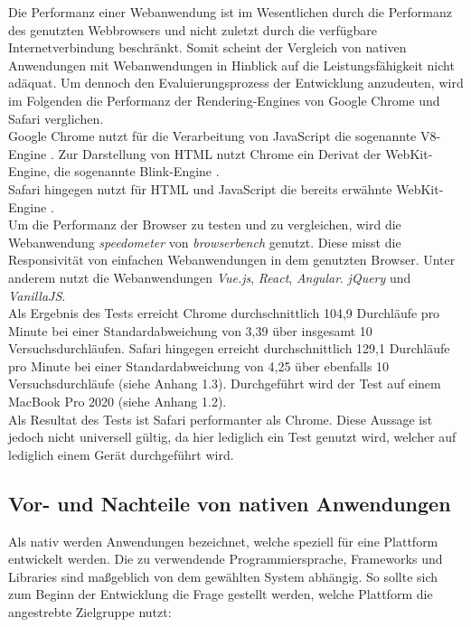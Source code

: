 \documentclass[a4paper]{scrartcl}
\begin{document}
Die Performanz einer Webanwendung ist im Wesentlichen durch die Performanz des genutzten Webbrowsers und nicht zuletzt durch die verfügbare Internetverbindung beschränkt. Somit scheint der Vergleich von nativen Anwendungen mit Webanwendungen in Hinblick auf die Leistungsfähigkeit nicht adäquat. Um dennoch den Evaluierungsprozess der Entwicklung anzudeuten, wird im Folgenden die Performanz der Rendering-Engines von Google Chrome und Safari verglichen. \\ 
Google Chrome nutzt für die Verarbeitung von JavaScript die sogenannte V8-Engine \autocite{v8_Engine}. Zur Darstellung von HTML nutzt Chrome ein Derivat der WebKit-Engine, die sogenannte Blink-Engine \autocite{Blink_Rendering}. \\
Safari hingegen nutzt für HTML und JavaScript die bereits erwähnte WebKit-Engine \autocite{WebKit}. \\
Um die Performanz der Browser zu testen und zu vergleichen, wird die Webanwendung \textit{speedometer} von \textit{browserbench} genutzt. Diese misst die Responsivität von einfachen Webanwendungen in dem genutzten Browser. Unter anderem nutzt die Webanwendungen \textit{Vue.js}, \textit{React}, \textit{Angular}. \textit{jQuery} und \textit{VanillaJS}. \\
Als Ergebnis des Tests erreicht Chrome durchschnittlich 104,9 Durchläufe pro Minute bei einer Standardabweichung von 3,39 über insgesamt 10 Versuchsdurchläufen. Safari hingegen erreicht durchschnittlich 129,1 Durchläufe pro Minute bei einer Standardabweichung von 4,25 über ebenfalls 10 Versuchsdurchläufe (siehe Anhang 1.3). Durchgeführt wird der Test auf einem MacBook Pro 2020 (siehe Anhang 1.2). \\
Als Resultat des Tests ist Safari performanter als Chrome. Diese Aussage ist jedoch nicht universell gültig, da hier lediglich ein Test genutzt wird, welcher auf lediglich einem Gerät durchgeführt wird. \\

\newpage

\subsection{Vor- und Nachteile von nativen Anwendungen}

Als nativ werden Anwendungen bezeichnet, welche speziell für eine Plattform entwickelt werden. Die zu verwendende Programmiersprache, Frameworks und Libraries sind maßgeblich von dem gewählten System abhängig. So sollte sich zum Beginn der Entwicklung die Frage gestellt werden, welche Plattform die angestrebte Zielgruppe nutzt:
\end{document}
